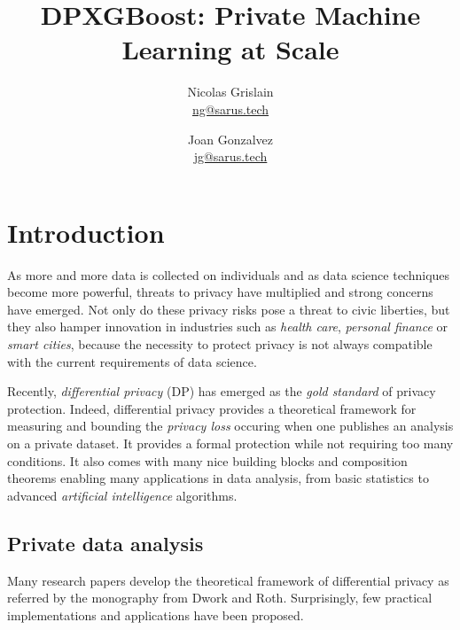 \documentclass{article}
\theoremstyle{definition}
\begin{document}
\title{DPXGBoost: Private Machine Learning at Scale}
\author{Nicolas Grislain\\
\url{ng@sarus.tech} \\ 
\and 
Joan Gonzalvez \\
\url{jg@sarus.tech}}
\date{}
\maketitle

\section{Introduction}

As more and more data is collected on individuals and as data science techniques become more powerful,
threats to privacy have multiplied and strong concerns have emerged.
Not only do these privacy risks pose a threat to civic liberties, but they also hamper innovation in industries
such as \emph{health care}, \emph{personal finance} or \emph{smart cities}, because the necessity to protect
privacy is not always compatible with the current requirements of data science.

Recently, \emph{differential privacy} (DP) \cite{dwork2014} has emerged as the \emph{gold standard} of
privacy protection. Indeed, differential privacy provides a theoretical framework for measuring and bounding
the \emph{privacy loss} occuring when one publishes an analysis on a private dataset.
It provides a formal protection while not requiring too many conditions.
It also comes with many nice building blocks and composition theorems enabling many applications in
data analysis, from basic statistics to advanced \emph{artificial intelligence} algorithms.

\subsection{Private data analysis}

Many research papers develop the theoretical framework of differential privacy as referred by
the monography \cite{dwork2014} from Dwork and Roth. Surprisingly, few practical implementations
and applications have been proposed.
\end{document}
